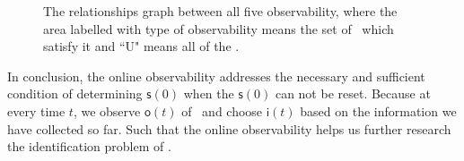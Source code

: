 \begin{figure}[thpb]
      \centering
      \caption{The relationships graph between all five observability, where the area labelled with type of observability means the set of \BCNs\ which satisfy it and  ``U" means all of the \BCNs.}
      \label{fig:7}
   \end{figure}


In conclusion, the online observability addresses the necessary and sufficient condition of determining $\mathsf{s}(0)$ when the $\mathsf{s}(0)$ can not be reset. Because at every time $t$, we observe $\mathsf{o}(t)$ of \BCN\ and choose $\mathsf{i}(t)$ based on the information we have collected so far. Such that the online observability helps us further research the identification problem of \BCNs. 